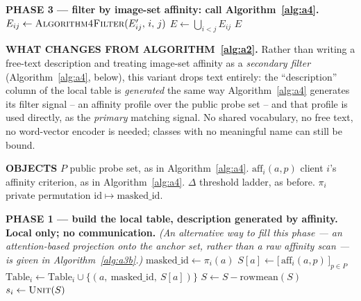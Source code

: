 \documentclass[11pt]{article}
\newcommand{\aff}{\mathrm{aff}}
\newcommand{\unit}{\textsc{Unit}}
\begin{document}
\begin{algorithm}[p]
\begin{algorithmic}[1]
\Statex \hrulefill
\Statex \textbf{PHASE 3 --- filter by image-set affinity: call
        Algorithm~\ref{alg:a4}.}
  \State $E_{ij} \gets \textsc{Algorithm4Filter}(E'_{ij},\, i,\, j)$
\EndFor
\State $E \gets \bigcup_{i<j} E_{ij}$
\State \Return $E$
\Statex \hrulefill

\end{algorithmic}
\end{algorithm}

\begin{algorithm}[p]
\caption{Affinity-generated description PSI, no description text at all
         (builds on Algorithm~\ref{alg:a2}, using affinity the same way as
         Algorithm~\ref{alg:a4})}
\label{alg:a3}
\footnotesize
{}
\begin{algorithmic}[1]

\Statex \hrulefill
\Statex \textbf{WHAT CHANGES FROM ALGORITHM~\ref{alg:a2}.} Rather than writing
        a free-text description and treating image-set affinity as a
        \emph{secondary filter} (Algorithm~\ref{alg:a4}, below), this variant
        drops text entirely: the ``description'' column of the local table is
        \emph{generated} the same way Algorithm~\ref{alg:a4} generates its
        filter signal -- an affinity profile over the public probe set -- and
        that profile is used directly, as the \emph{primary} matching signal.
        No shared vocabulary, no free text, no word-vector encoder is needed;
        classes with no meaningful name can still be bound.

\Statex \textbf{OBJECTS}
\Statex \quad $P$ \quad public probe set, as in Algorithm~\ref{alg:a4}.
\Statex \quad $\aff_i(a,p)$ \quad client $i$'s affinity criterion, as in
        Algorithm~\ref{alg:a4}.
\Statex \quad $\Delta$ \quad threshold ladder, as before.
\Statex \quad $\pi_i$ \quad private permutation
        $\mathrm{id} \mapsto \mathrm{masked\_id}$.

\Statex \hrulefill
\Statex \textbf{PHASE 1 --- build the local table, description generated by
        affinity. Local only; no communication.}
\Statex \emph{(An alternative way to fill this phase --- an attention-based
        projection onto the anchor set, rather than a raw affinity scan --- is
        given in Algorithm~\ref{alg:a3b}.)}
    \State $\mathrm{masked\_id} \gets \pi_i(a)$
    \State $S[a] \gets \big[\,\aff_i(a,p)\,\big]_{p \in P}$
    \State $\mathrm{Table}_i \gets \mathrm{Table}_i \cup
           \{(a,\ \mathrm{masked\_id},\ S[a])\}$
  \EndFor
  \State $S \gets S - \mathrm{rowmean}(S)$
  \State $s_i \gets \unit(S)$
\EndFor


\end{algorithmic}
\end{algorithm}
\end{document}
